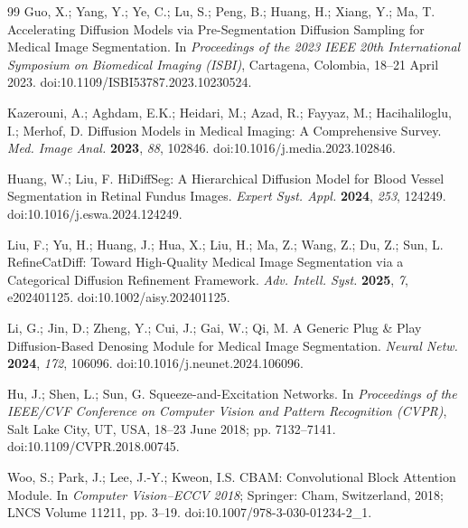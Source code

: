 \documentclass[jimaging,article,submit,pdftex,moreauthors]
  {Definitions/mdpi}
\providecommand{\href}[2]{#2}
\begin{document}
\begin{thebibliography}{99}
Guo, X.; Yang, Y.; Ye, C.; Lu, S.; Peng, B.; Huang, H.; Xiang, Y.; Ma, T. Accelerating Diffusion Models via Pre-Segmentation Diffusion Sampling for Medical Image Segmentation. In \textit{Proceedings of the 2023 IEEE 20th International Symposium on Biomedical Imaging (ISBI)}, Cartagena, Colombia, 18--21 April 2023. \href{https://doi.org/10.1109/ISBI53787.2023.10230524}{doi:10.1109/ISBI53787.2023.10230524}.

Kazerouni, A.; Aghdam, E.K.; Heidari, M.; Azad, R.; Fayyaz, M.; Hacihaliloglu, I.; Merhof, D. Diffusion Models in Medical Imaging: A Comprehensive Survey. \textit{Med. Image Anal.} \textbf{2023}, \textit{88}, 102846. \href{https://doi.org/10.1016/j.media.2023.102846}{doi:10.1016/j.media.2023.102846}.

Huang, W.; Liu, F. HiDiffSeg: A Hierarchical Diffusion Model for Blood Vessel Segmentation in Retinal Fundus Images. \textit{Expert Syst. Appl.} \textbf{2024}, \textit{253}, 124249. \href{https://doi.org/10.1016/j.eswa.2024.124249}{doi:10.1016/j.eswa.2024.124249}.

Liu, F.; Yu, H.; Huang, J.; Hua, X.; Liu, H.; Ma, Z.; Wang, Z.; Du, Z.; Sun, L. RefineCatDiff: Toward High-Quality Medical Image Segmentation via a Categorical Diffusion Refinement Framework. \textit{Adv. Intell. Syst.} \textbf{2025}, \textit{7}, e202401125. \href{https://doi.org/10.1002/aisy.202401125}{doi:10.1002/aisy.202401125}.

Li, G.; Jin, D.; Zheng, Y.; Cui, J.; Gai, W.; Qi, M. A Generic Plug \& Play Diffusion-Based Denosing Module for Medical Image Segmentation. \textit{Neural Netw.} \textbf{2024}, \textit{172}, 106096. \href{https://doi.org/10.1016/j.neunet.2024.106096}{doi:10.1016/j.neunet.2024.106096}.

Hu, J.; Shen, L.; Sun, G. Squeeze-and-Excitation Networks. In \textit{Proceedings of the IEEE/CVF Conference on Computer Vision and Pattern Recognition (CVPR)}, Salt Lake City, UT, USA, 18--23 June 2018; pp. 7132--7141. \href{https://doi.org/10.1109/CVPR.2018.00745}{doi:10.1109/CVPR.2018.00745}.

Woo, S.; Park, J.; Lee, J.-Y.; Kweon, I.S. CBAM: Convolutional Block Attention Module. In \textit{Computer Vision--ECCV 2018}; Springer: Cham, Switzerland, 2018; LNCS Volume 11211, pp. 3--19. \href{https://doi.org/10.1007/978-3-030-01234-2_1}{doi:10.1007/978-3-030-01234-2\_1}.


\end{thebibliography}
\end{document}
